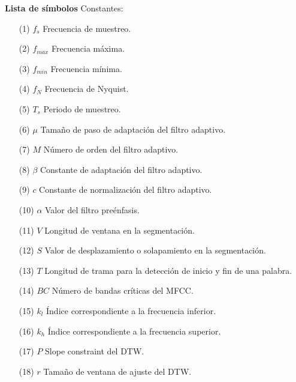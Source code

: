 \newpage
{}
 {\bf\LARGE Lista de símbolos}
 \vskip 1.5cm
Constantes: 
\begin{enumerate}
\item[(1)]$f_{s}$ \hspace*{0.9cm} Frecuencia de muestreo.
\item[(2)]$f_{max}$ \hspace*{0.45cm} Frecuencia máxima.
\item[(3)]$f_{min}$ \hspace*{0.5cm} Frecuencia mínima.
\item[(4)]$f_{N}$ \hspace*{0.8cm} Frecuencia de Nyquist.
\item[(5)]$T_{s}$ \hspace*{0.9cm} Periodo de muestreo.
\item[(6)]$\mu$ \hspace*{1.05cm} Tamaño de paso de adaptación del filtro adaptivo.
\item[(7)]$M$ \hspace*{0.85cm} Número de orden del filtro adaptivo.
\item[(8)]$\beta$ \hspace*{1.0cm} Constante de adaptación del filtro adaptivo.
\item[(9)]$c$ \hspace*{1.1cm} Constante de normalización del filtro adaptivo.
\item[(10)]$\alpha$ \hspace*{1.0cm} Valor del filtro preénfasis.
\item[(11)]$V$ \hspace*{1.0cm} Longitud de ventana en la segmentación.
\item[(12)]$S$ \hspace*{1.0cm} Valor de desplazamiento o solapamiento en la segmentación.
\item[(13)]$T$ \hspace*{0.9cm} Longitud de trama para la detección de inicio y fin de una palabra.
\item[(14)]$BC$ \hspace*{0.6cm} Número de bandas críticas del MFCC.
\item[(15)]$k_{l}$ \hspace*{0.9cm} Índice correspondiente a la frecuencia inferior.
\item[(16)]$k_{h}$ \hspace*{0.8cm} Índice correspondiente a la frecuencia superior.
\item[(17)]$P$ \hspace*{0.9cm} Slope constraint del DTW.
\item[(18)]$r$ \hspace*{1.0cm} Tamaño de ventana de ajuste del DTW.
\vskip 3cm
\end{enumerate} 
